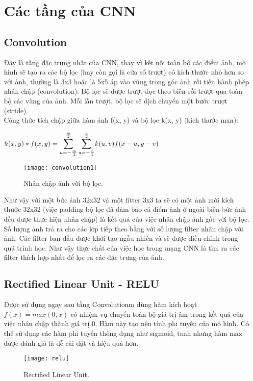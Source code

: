 \documentclass[13pt, a4paper]{extreport}
\begin{document}
\section{Các tầng của CNN}
\subsection{Convolution}
\indent Đây là tầng đặc trưng nhất của CNN, thay vì kết nối toàn bộ các điểm ảnh, mô hình sẽ tạo ra các bộ lọc (hay còn gọi là cửa sổ trượt) có kích thước nhỏ hơn so với ảnh, thường là 3x3 hoặc là 5x5 áp vào vùng trong góc ảnh rồi tiến hành phép nhân chập (convolution). Bộ lọc sẽ được trượt dọc theo biên rồi trượt qua toàn bộ các vùng của ảnh. Mỗi lần trượt, bộ lọc sẽ dịch chuyển một bước trượt (stride). \\
\indent Công thức tích chập giữa hàm ảnh f(x, y) và bộ lọc k(x, y) (kích thước mxn):
\begin{center}
$k(x, y) * f(x, y) = \mathlarger{\sum\limits_{u=-\frac{m}{2}}^{\frac{m}{2}}\sum\limits_{u=-\frac{n}{2}}^{\frac{n}{2}}}k(u, v)f(x-u, y-v) $
\end{center}

\begin{figure}[H]
  \centering
    \texttt{[image: convolution1]}
   \caption{\large Nhân chập ảnh với bộ lọc.}
\end{figure}

\indent Như vậy với một bức ảnh 32x32 và một fitter 3x3 ta sẽ có một ảnh mới kích thước 32x32 (việc padding bộ lọc đã đảm bảo cả điểm ảnh ở ngoài biên bức ảnh đều được thực hiện nhân chập) là kết quả của việc nhân chập ảnh gốc với bộ lọc. Số lượng ảnh trả ra cho các lớp tiếp theo bằng với số lượng filter nhân chập với ảnh. Các filter ban đầu được khởi tạo ngẫu nhiên và sẽ được điều chỉnh trong quá trình học. Như vậy thực chất của việc học trong mạng CNN là tìm ra các filter thích hợp nhất để lọc ra các đặc trưng của ảnh.
\subsection{Rectified Linear Unit - RELU}
\indent Được sử dụng ngay sau tầng Convolutionm dùng hàm kích hoạt $f(x) = max(0, x)$ có nhiệm vụ chuyển toàn bộ giá trị âm trong kết quả của việc nhân chập thành giá trị 0. Hàm này tạo nên tính phi tuyến của mô hình. Có thể sử dụng các hàm phi tuyến thông dụng như sigmoid, tanh nhưng hàm max được đánh giá là dễ cài đặt và hiệu quả hơn.
\begin{figure}[H]
  \centering
    \texttt{[image: relu]}
   \caption{\large Rectified Linear Unit.}
\end{figure}
\end{document}
